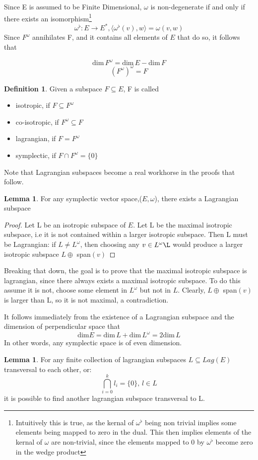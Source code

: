 \documentclass[12pt]{article}
\theoremstyle{definition}
\newtheorem{definition}{Definition}[section]
\newtheorem{lemma}[theorem]{Lemma}
\begin{document}
Since E is assumed to be Finite Dimensional, $\omega$ is non-degenerate if and only if there exists an isomorphism\footnote{Intuitively this is true, as the kernal of $\omega^\flat$ being non trivial implies some elements being mapped to zero in the dual. This then implies elements of the kernal of $\omega$ are non-trivial, since the elements mapped to 0 by $\omega^\flat$ become zero in the wedge product}
$$ \omega^\flat: E \rightarrow E^*, \langle \omega^\flat(v),w \rangle = \omega(v,w)$$
Since $F^\omega$ annihilates F, and it contains all elements of $E$ that do so, it follows that 

$$ \text{dim} \, F^\omega = \text{dim} \,  E - \text{dim} \,  F$$
$$ (F^\omega)^\omega = F$$
\begin{definition}
 Given a subspace $F \subseteq E$, F is called 
 \begin{itemize}
 \item isotropic, if $F \subseteq F^\omega$
 \item co-isotropic, if $F^\omega \subseteq F$
 \item lagrangian, if $F = F^\omega$
 \item symplectic, if $F \cap F^\omega = \{0\}$
 \end{itemize}
\end{definition}
Note that Lagrangian subspaces become a real workhorse in the proofs that follow.
\pagebreak
\begin{lemma}
For any symplectic vector space,($E,\omega$), there exists a Lagrangian subspace 
\end{lemma}
\begin{proof}


Let L be an isotropic subspace of $E$. Let L be the maximal isotropic subspace, i.e it is not contained within a larger isotropic subspace. Then L must be Lagrangian: if $L \neq L^\omega$, then choosing any $v \in L^\omega\L$ would produce a larger isotropic subspace $L \oplus $ span$(v)$   
\end{proof}

Breaking that down, the goal is to prove that the maximal isotropic subspace is lagrangian, since there always exists a maximal isotropic subspace. To do this assume it is not, choose some element in $L^\omega$ but not in $L$. Clearly, $L \oplus $ span$(v)$ is larger than L, so it is not maximal, a contradiction. \par
It follows immediately from the existence of a Lagrangian subspace and the dimension of perpendicular space that $$  \text{dim} E = \text{dim} \,  L + \text{dim} \, L^\omega = 2 \text{dim} \,  L $$
In other words, any symplectic space is of even dimension.
\begin{lemma}

For any finite collection of lagrangian subspaces $L \subseteq Lag(E)$ transversal to each other, or: $$ {\bigcap}_{i=0}^k l_i = \{ 0\}, \, l \in L$$ it is possible to find another lagrangian subspace transversal to L.

\end{lemma}
\end{document}
